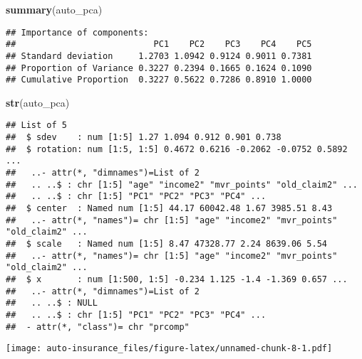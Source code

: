 \documentclass[]{article}
\newenvironment{Shaded}{\begin{snugshade}}{\end{snugshade}}
\newcommand{\KeywordTok}[1]{\textcolor[rgb]{0.13,0.29,0.53}{\textbf{#1}}}
\newcommand{\DataTypeTok}[1]{\textcolor[rgb]{0.13,0.29,0.53}{#1}}
\newcommand{\OtherTok}[1]{\textcolor[rgb]{0.56,0.35,0.01}{#1}}
\newcommand{\OperatorTok}[1]{\textcolor[rgb]{0.81,0.36,0.00}{\textbf{#1}}}
\newcommand{\NormalTok}[1]{#1}
\begin{document}
\begin{Shaded}
\begin{Highlighting}[]
\KeywordTok{summary}\NormalTok{(auto_pca)}
\end{Highlighting}
\end{Shaded}

\begin{verbatim}
## Importance of components:
##                           PC1    PC2    PC3    PC4    PC5
## Standard deviation     1.2703 1.0942 0.9124 0.9011 0.7381
## Proportion of Variance 0.3227 0.2394 0.1665 0.1624 0.1090
## Cumulative Proportion  0.3227 0.5622 0.7286 0.8910 1.0000
\end{verbatim}

\begin{Shaded}
\begin{Highlighting}[]
\KeywordTok{str}\NormalTok{(auto_pca)}
\end{Highlighting}
\end{Shaded}

\begin{verbatim}
## List of 5
##  $ sdev    : num [1:5] 1.27 1.094 0.912 0.901 0.738
##  $ rotation: num [1:5, 1:5] 0.4672 0.6216 -0.2062 -0.0752 0.5892 ...
##   ..- attr(*, "dimnames")=List of 2
##   .. ..$ : chr [1:5] "age" "income2" "mvr_points" "old_claim2" ...
##   .. ..$ : chr [1:5] "PC1" "PC2" "PC3" "PC4" ...
##  $ center  : Named num [1:5] 44.17 60042.48 1.67 3985.51 8.43
##   ..- attr(*, "names")= chr [1:5] "age" "income2" "mvr_points" "old_claim2" ...
##  $ scale   : Named num [1:5] 8.47 47328.77 2.24 8639.06 5.54
##   ..- attr(*, "names")= chr [1:5] "age" "income2" "mvr_points" "old_claim2" ...
##  $ x       : num [1:500, 1:5] -0.234 1.125 -1.4 -1.369 0.657 ...
##   ..- attr(*, "dimnames")=List of 2
##   .. ..$ : NULL
##   .. ..$ : chr [1:5] "PC1" "PC2" "PC3" "PC4" ...
##  - attr(*, "class")= chr "prcomp"
\end{verbatim}

\begin{Shaded}
\end{Shaded}

\texttt{[image: auto-insurance\_files/figure-latex/unnamed-chunk-8-1.pdf]}

\begin{Shaded}
\end{Shaded}
\end{document}
